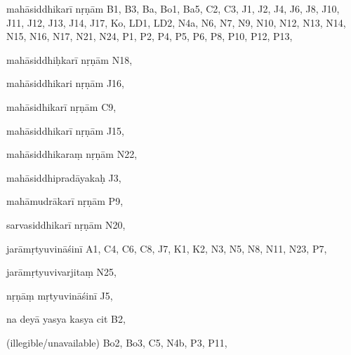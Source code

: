 \begin{marma}[hp02_018]


\item[mahāsiddhikarī nṛṇām] B1, B3, Ba, Bo1, Ba5, C2, C3, J1, J2, J4, J6, J8, J10, J11, J12, J13, J14, J17, Ko, LD1, LD2, N4a, N6, N7, N9, N10, N12, N13, N14, N15, N16, N17, N21, N24, P1, P2, P4, P5, P6, P8, P10, P12, P13, 
\item[mahāsiddhiḥkarī nṛṇām] N18,
\item[mahāsiddhikari nṛṇām] J16,
\item[mahāsidhikarī nṛṇām] C9,
\item[mahāsiddhikarī nṛṇām] J15,
\item[mahāsiddhikaraṃ nṛṇām] N22,
\item[mahāsiddhipradāyakaḥ] J3,
\item[mahāmudrākarī nṛṇām] P9,
\item[sarvasiddhikarī nṛṇām] N20,
\item[jarāmṛtyuvināśinī] A1, C4, C6, C8, J7, K1, K2, N3, N5, N8, N11, N23, P7, 
\item[jarāmṛtyuvivarjitaṃ] N25,
\item[nṛṇāṃ mṛtyuvināśinī] J5,
\item[na deyā yasya kasya cit] B2,
  \item[(illegible/unavailable)] Bo2, Bo3, C5, N4b, P3, P11, 

  \begin{description}
    \end{description}

\end{marma}
  
